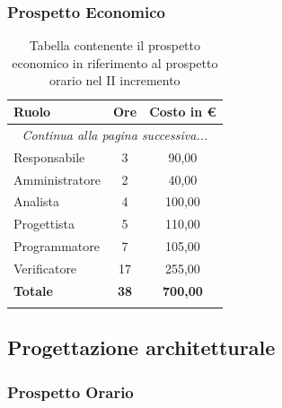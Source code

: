 \documentclass[../piano_di_progetto.tex]{subfiles}
\begin{document}
\subsubsection{Prospetto Economico}

\begin{center}
	\begin{longtable}{|l|c|c|}
		\hline
		\rowcolor{lightgray}
		\textbf{Ruolo} & \textbf{Ore} & \textbf{Costo in €}\\
		\hline
		\endhead
		
		\hline
		\multicolumn{3}{|c|}{\emph{Continua alla pagina successiva...}}\\
		\hline
		\endfoot

		\endlastfoot

		\hline
		Responsabile & 3 & 90,00\\
		Amministratore & 2 & 40,00\\
		Analista & 4 & 100,00\\
		Progettista & 5 & 110,00\\
		Programmatore & 7 & 105,00\\
		Verificatore & 17 & 255,00\\
		\hline
		\textbf{Totale} & \textbf{38} & \textbf{700,00}\\
		\hline
		\rowcolor{white}
		\caption{Tabella contenente il prospetto economico in riferimento al prospetto orario nel II incremento}
	\end{longtable}
\end{center}

\subsection{Progettazione architetturale}%
\label{sub:fase_prog_arc}
\subsubsection{Prospetto Orario}
\end{document}
